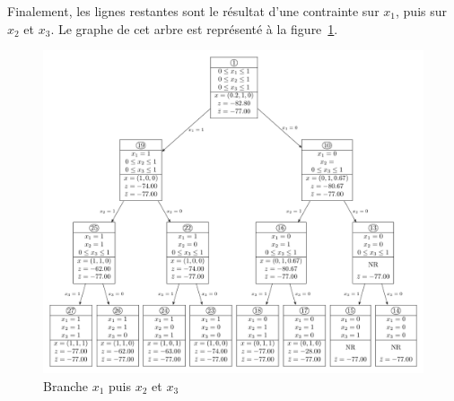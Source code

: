 Finalement, les lignes restantes sont le résultat d’une contrainte sur $x_1$, puis sur $x_2$ et $x_3$. Le graphe de cet arbre est représenté à la figure~\ref{arbre4}.

\begin{figure}[htb]
	\caption{Branche $x_1$ puis $x_2$ et $x_3$}
	\label{arbre4}
	\centering
	\includegraphics[width=.8\linewidth]{question/forest/4.pdf}
\end{figure}
